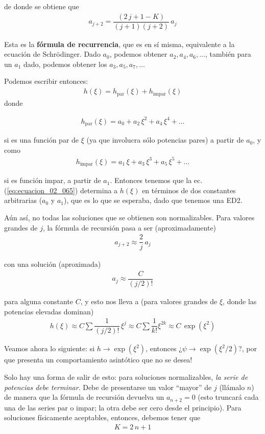 de donde se obtiene que
\begin{align}
a_{j+2} = \dfrac{(2 \, j + 1 - K)}{(j + 1)(j + 2)} \, a_{j}
\label{eq:ecuacion_02_065}
\end{align}

Esta es la \textbf{fórmula de recurrencia}, que es en sí misma, equivalente a la ecuación de Schrödinger. Dado $a_{0}$, podemos obtener $a_{2}, a_{4}, a_{6}, \ldots$, también para un $a_{1}$ dado, podemos obtener los $a_{3}, a_{5}, a_{7}, \ldots$
\par
Podemos escribir entonces:
\begin{align}
h (\xi) = h_{\text{par}} (\xi) + h_{\text{impar}} (\xi)
\label{eq:ecuacion_02_066}
\end{align}
donde

\begin{align*}
h_{\text{par}} (\xi) = a_{0} + a_{2} \, \xi^{2} + a_{4} \, \xi^{4} + \ldots
\end{align*}

si es una función par de $\xi$ (ya que involucra sólo potencias pares) a partir de $a_{0}$, y como
\begin{align*}
h_{\text{impar}} (\xi) = a_{1} \, \xi + a_{3} \, \xi^{3} + a_{5} \, \xi^{5} + \ldots
\end{align*}

si es función impar, a partir de $a_{1}$. Entonces tenemos que la ec. (\ref{eq:ecuacion_02_065}) determina a $h(\xi)$ en términos de dos constantes arbitrarias ($a_{0}$ y $a_{1}$), que es lo que se esperaba, dado que tenemos una ED2.
\par
Aún así, no todas las soluciones que se obtienen son normalizables. Para valores grandes de $j$, la fórmula de recursión pasa a ser (aproximadamente)
\begin{align*}
a_{j+2} \approx \dfrac{2}{j} \, a_{j}
\end{align*}

con una solución (aproximada)
\begin{align*}
a_{j} \approx \dfrac{C}{(j/2)!}
\end{align*}

para alguna constante $C$, y esto nos lleva a (para valores grandes de $\xi$, donde las potencias elevadas dominan)
\begin{align*}
h (\xi) \approx C \sum \dfrac{1}{(j/2)!} \, \xi^{j} \approx C \sum \dfrac{1}{k!} \xi^{2 k} \approx C \, \exp \left( \xi^{2} \right)
\end{align*}

Veamos ahora lo siguiente: si $h \to \exp \left( \xi^{2} \right)$, entonces ¿$\psi \to \exp \left( \xi^{2}/2 \right)$?, por que presenta un comportamiento asintótico que no se desea!
\par
Solo hay una forma de salir de esto: para soluciones normalizables, \textit{la serie de potencias debe terminar}. Debe de presentarse un valor \enquote{mayor} de $j$ (llámalo $n$) de manera que la fórmula de recursión devuelva un $a_{n+2} = 0$ (esto truncará cada una de las series par o impar; la otra debe ser cero desde el principio). Para soluciones físicamente aceptables, entonces, debemos tener que
\begin{align*}
K = 2 \, n + 1
\end{align*}

